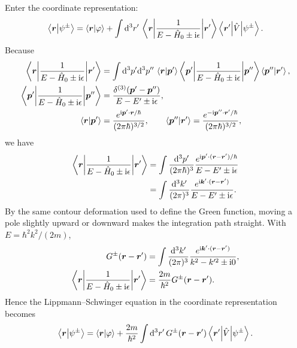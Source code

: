 Enter the coordinate representation:
\begin{equation}
\left\langle\bm{r}\middle|\psi^\pm\right\rangle=\left\langle\bm{r}\middle|\varphi\right\rangle
+\int\mathrm{d}^3r'\,\left\langle\bm{r}\middle|\frac1{E-\hat{H}_0\pm\mathrm{i}\epsilon}\middle|\bm{r}'\right\rangle
\left\langle\bm{r}'\middle|\hat{V}\middle|\psi^\pm\right\rangle.
\end{equation}
Because
\begin{equation}\begin{aligned}
\left\langle\bm{r}\middle|\frac{1}{E-\hat{H}_0\pm\mathrm{i}\epsilon}\middle|\bm{r}'\right\rangle
&=\int\mathrm{d}^3p'\mathrm{d}^3p''\,\left\langle\bm{r}\middle|\bm{p}'\right\rangle
\left\langle\bm{p}'\middle|\frac1{E-\hat{H}_0\pm\mathrm{i}\epsilon}\middle|\bm{p}''\right\rangle
\left\langle\bm{p}''\middle|\bm{r}'\right\rangle,\\
\left\langle\bm{p}'\middle|\frac1{E-\hat{H}_0\pm\mathrm{i}\epsilon}\middle|\bm{p}''\right\rangle
&=\frac{\delta^{(3)}(\bm{p}'-\bm{p}'')}{E-E'\pm\mathrm{i}\epsilon},\\
\left\langle\bm{r}\middle|\bm{p}'\right\rangle&=\frac{e^{\mathrm{i}\bm{p}'\cdot\bm{r}/\hbar}}{(2\pi\hbar)^{3/2}},\qquad
\left\langle\bm{p}''\middle|\bm{r}'\right\rangle=\frac{e^{-\mathrm{i}\bm{p}''\cdot\bm{r}'/\hbar}}{(2\pi\hbar)^{3/2}},
\end{aligned}\end{equation}
we have
\begin{equation}\begin{aligned}
\left\langle\bm{r}\middle|\frac1{E-\hat{H}_0\pm\mathrm{i}\epsilon}\middle|\bm{r}'\right\rangle
&=\int\frac{\mathrm{d}^3p'}{(2\pi\hbar)^3}
\frac{e^{\mathrm{i}\bm{p}'\cdot(\bm{r}-\bm{r}')/\hbar}}{E-E'\pm\mathrm{i}\epsilon}\\
&=\int\frac{\mathrm{d}^3k'}{(2\pi)^3}
\frac{e^{\mathrm{i}\bm{k}'\cdot(\bm{r}-\bm{r}')}}{E-E'\pm\mathrm{i}\epsilon}.
\end{aligned}\end{equation}
By the same contour deformation used to define the Green function, moving a pole slightly upward or downward makes the integration path straight. With $E=\hbar^2k^2/(2m)$,
\begin{equation}\begin{aligned}
G^\pm(\bm{r}-\bm{r}')
&=\int\frac{\mathrm{d}^3k'}{(2\pi)^3}
\frac{e^{\mathrm{i}\bm{k}'\cdot(\bm{r}-\bm{r}')}}{k^2-k'^2\pm\mathrm{i}0},\\
\left\langle\bm{r}\middle|\frac1{E-\hat{H}_0\pm\mathrm{i}\epsilon}\middle|\bm{r}'\right\rangle
&=\frac{2m}{\hbar^2}G^\pm(\bm{r}-\bm{r}').
\end{aligned}\end{equation}
Hence the Lippmann--Schwinger equation in the coordinate representation becomes
\begin{equation}
\left\langle\bm{r}\middle|\psi^\pm\right\rangle=\left\langle\bm{r}\middle|\varphi\right\rangle
+\frac{2m}{\hbar^2}\int\mathrm{d}^3r'\,G^\pm(\bm{r}-\bm{r}')
\left\langle\bm{r}'\middle|\hat{V}\middle|\psi^\pm\right\rangle.
\end{equation}
